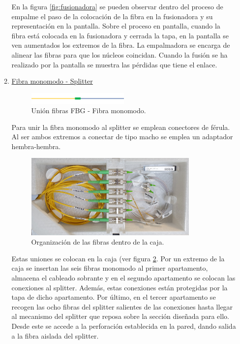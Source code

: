 \begin{itemize}
\begin{enumerate}
	En la figura \ref{fig:fusionadora} se pueden observar dentro del proceso de empalme el paso de la colocación de la fibra en la fusionadora y su representación en la pantalla. Sobre el proceso en pantalla, cuando la fibra está colocada en la fusionadora y cerrada la tapa, en la pantalla se ven aumentados los extremos de la fibra. La empalmadora se encarga de alinear las fibras para que los núcleos coincidan. Cuando la fusión se ha realizado por la pantalla se muestra las pérdidas que tiene el enlace.  
	

	
	\item \underline{Fibra monomodo - Splitter}
	
	\begin{figure}[H]
		\centering
		\includegraphics[width=0.5\textwidth]{./img/union2}
		\caption{Unión fibras FBG - Fibra monomodo.} 
		\label{fig:union2}
	\end{figure}  
	
	Para unir la fibra monomodo al splitter se emplean conectores de férula. Al ser ambos extremos a conectar de tipo macho se emplea un adaptador hembra-hembra. 
	
	\begin{figure}[H]
		\centering
		\includegraphics[width=0.85\textwidth]{./img/cajaOrden}
		\caption{Organización de las fibras dentro de la caja.} 
		\label{fig:CajaOrden}
	\end{figure}  
	
	Estas uniones se colocan en la caja (ver figura \ref{fig:CajaOrden}. Por un extremo de la caja se insertan las seis fibras monomodo al primer apartamento, almacena el cableado sobrante y en el segundo apartamento se colocan las conexiones al splitter. Además, estas conexiones están protegidas por la tapa de dicho apartamento. Por último, en el tercer apartamento se recogen las ocho fibras del splitter salientes de las conexiones hasta llegar al mecanismo del splitter que reposa sobre la sección diseñada para ello. Desde este se accede a la perforación establecida en la pared, dando salida a la fibra aislada del splitter.


\end{enumerate}
\end{itemize}
